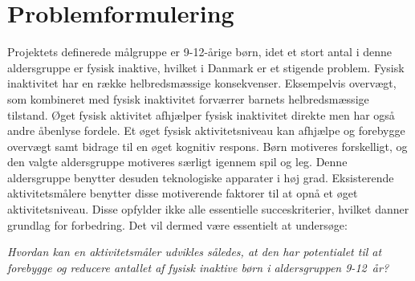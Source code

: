 \section{Problemformulering}\label{Problemformulering}
Projektets definerede målgruppe er 9-12-årige børn, idet et stort antal i denne aldersgruppe er fysisk inaktive, hvilket i Danmark er et stigende problem. Fysisk inaktivitet har en række helbredsmæssige konsekvenser. Eksempelvis overvægt, som kombineret med fysisk inaktivitet forværrer barnets helbredsmæssige tilstand. Øget fysisk aktivitet afhjælper fysisk inaktivitet direkte men har også andre åbenlyse fordele. Et øget fysisk aktivitetsniveau kan afhjælpe og forebygge overvægt samt bidrage til en øget kognitiv respons. Børn motiveres forskelligt, og den valgte aldersgruppe motiveres særligt igennem spil og leg. Denne aldersgruppe benytter desuden teknologiske apparater i høj grad. Eksisterende aktivitetsmålere benytter disse motiverende faktorer til at opnå et øget aktivitetsniveau. Disse opfylder ikke alle essentielle succeskriterier, hvilket danner grundlag for forbedring. Det vil dermed være essentielt at undersøge:

\begin{center}
\textit{Hvordan kan en aktivitetsmåler udvikles således, at den har potentialet til at forebygge og reducere antallet af fysisk inaktive børn i aldersgruppen 9-12~år?}
\end{center}

